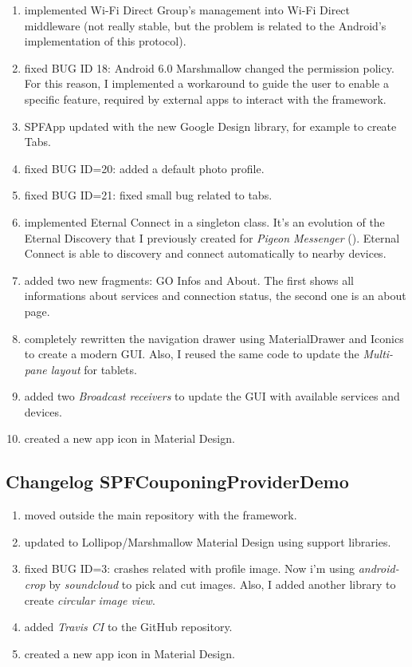 \begin{enumerate}
	\item implemented Wi-Fi Direct Group's management into Wi-Fi Direct middleware (not really stable, but the problem is related to the Android's implementation of this protocol).
	\item fixed BUG ID 18: Android 6.0 Marshmallow changed the permission policy. For this reason, I implemented a workaround to guide the user to enable a specific feature, required by external apps to interact with the framework.
	\item \textsf{SPFApp} updated with the new Google Design library, for example to create Tabs.
	\item fixed BUG ID=20: added a default photo profile.
	\item fixed BUG ID=21: fixed small bug related to tabs.
	\item implemented \textsf{Eternal Connect} in a singleton class. It's an evolution of the \textsf{Eternal Discovery} that I previously created for \emph{Pigeon Messenger} (). \textsf{Eternal Connect} is able to discovery and connect automatically to nearby devices.
	\item added two new fragments: \textsf{GO Infos} and \textsf{About}. The first shows all informations about services and connection status, the second one is an about page.
	\item completely rewritten the navigation drawer using \textsf{MaterialDrawer} and \textsf{Iconics} to create a modern GUI. Also, I reused the same code to update the \emph{Multi-pane layout} for tablets.
	\item added two \emph{Broadcast receivers} to update the GUI with available services and devices.
	\item created a new app icon in Material Design.
\end{enumerate}

\subsection*{Changelog SPFCouponingProviderDemo}
\begin{enumerate}
	\item moved outside the main repository with the framework.
	\item updated to Lollipop/Marshmallow Material Design using support libraries.
	\item fixed BUG ID=3: crashes related with profile image. Now i'm using \emph{android-crop} by \emph{soundcloud} to pick and cut images. Also, I added another library to create \emph{circular image view}.	
	\item added \emph{Travis CI} to the GitHub repository.
	\item created a new app icon in Material Design.
\end{enumerate}

